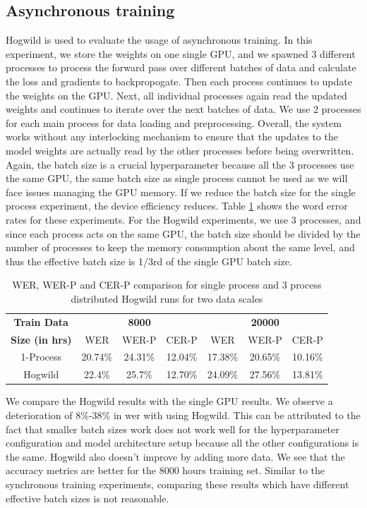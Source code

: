 \subsection{Asynchronous training}
Hogwild \cite{Niu2011HOGWILD:Descent} is used to evaluate the usage of asynchronous training. In this experiment, we store the weights on one single GPU, and we spawned 3 different processes to process the forward pass over different batches of data and calculate the loss and gradients to backpropogate. Then each process continues to update the weights on the GPU. Next, all individual processes again read the updated weights and continues to iterate over the next batches of data. We use 2 processes for each main process for data loading and preprocessing. Overall, the system works without any interlocking mechanism to ensure that the updates to the model weights are actually read by the other processes before being overwritten. Again, the batch size is a crucial hyperparameter because all the 3 processes use the same GPU, the same batch size as single process cannot be used as we will face issues managing the GPU memory. If we reduce the batch size for the single process experiment, the device efficiency reduces. Table \ref{table:wer_hog} shows the word error rates for these experiments. For the Hogwild experiments, we use 3 processes, and since each process acts on the same GPU, the batch size should be divided by the number of processes to keep the memory consumption about the same level, and thus the effective batch size is 1/3rd of the single GPU batch size.

\begin{table}[ht]
\centering
\begin{tabular}{c | c c c | c c c }
\hline
\textbf{Train Data} & \multicolumn{3}{c|}{\textbf{8000}} & \multicolumn{3}{c}{\textbf{20000}}\\\cline{2-7}
   \textbf{Size (in hrs)} & WER & WER-P & CER-P & WER & WER-P & CER-P\\
 \hline
  1-Process & 20.74\% & 24.31\% & 12.04\% & 17.38\% & 20.65\% & 10.16\%\\
  Hogwild & 22.4\% & 25.7\% & 12.70\% & 24.09\% & 27.56\% & 13.81\% \\
 \hline
\end{tabular}
\caption{\label{table:wer_hog} WER, WER-P and CER-P comparison for single process and 3 process distributed Hogwild runs for two data scales}
\end{table}

We compare the Hogwild results with the single GPU results. We observe a deterioration of 8\%-38\% in \acrshort{wer} with using Hogwild. This can be attributed to the fact that smaller batch sizes work does not work well for the hyperparameter configuration and model architecture setup because all the other configurations is the same. Hogwild also doesn't improve by adding more data. We see that the accuracy metrics are better for the 8000 hours training set. Similar to the synchronous training experiments, comparing these results which have different effective batch sizes is not reasonable. 

